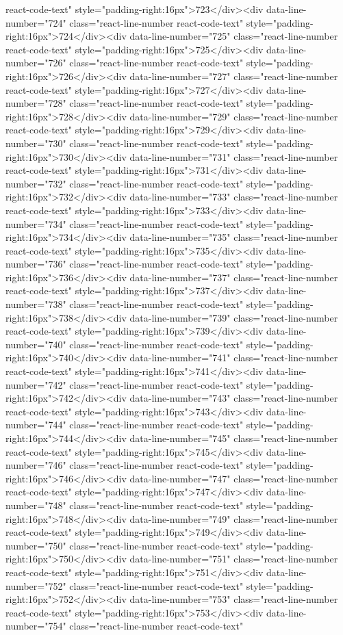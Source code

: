{{{{{{{react-code-text" style="padding-right:16px">723</div><div data-line-number="724" class="react-line-number react-code-text" style="padding-right:16px">724</div><div data-line-number="725" class="react-line-number react-code-text" style="padding-right:16px">725</div><div data-line-number="726" class="react-line-number react-code-text" style="padding-right:16px">726</div><div data-line-number="727" class="react-line-number react-code-text" style="padding-right:16px">727</div><div data-line-number="728" class="react-line-number react-code-text" style="padding-right:16px">728</div><div data-line-number="729" class="react-line-number react-code-text" style="padding-right:16px">729</div><div data-line-number="730" class="react-line-number react-code-text" style="padding-right:16px">730</div><div data-line-number="731" class="react-line-number react-code-text" style="padding-right:16px">731</div><div data-line-number="732" class="react-line-number react-code-text" style="padding-right:16px">732</div><div data-line-number="733" class="react-line-number react-code-text" style="padding-right:16px">733</div><div data-line-number="734" class="react-line-number react-code-text" style="padding-right:16px">734</div><div data-line-number="735" class="react-line-number react-code-text" style="padding-right:16px">735</div><div data-line-number="736" class="react-line-number react-code-text" style="padding-right:16px">736</div><div data-line-number="737" class="react-line-number react-code-text" style="padding-right:16px">737</div><div data-line-number="738" class="react-line-number react-code-text" style="padding-right:16px">738</div><div data-line-number="739" class="react-line-number react-code-text" style="padding-right:16px">739</div><div data-line-number="740" class="react-line-number react-code-text" style="padding-right:16px">740</div><div data-line-number="741" class="react-line-number react-code-text" style="padding-right:16px">741</div><div data-line-number="742" class="react-line-number react-code-text" style="padding-right:16px">742</div><div data-line-number="743" class="react-line-number react-code-text" style="padding-right:16px">743</div><div data-line-number="744" class="react-line-number react-code-text" style="padding-right:16px">744</div><div data-line-number="745" class="react-line-number react-code-text" style="padding-right:16px">745</div><div data-line-number="746" class="react-line-number react-code-text" style="padding-right:16px">746</div><div data-line-number="747" class="react-line-number react-code-text" style="padding-right:16px">747</div><div data-line-number="748" class="react-line-number react-code-text" style="padding-right:16px">748</div><div data-line-number="749" class="react-line-number react-code-text" style="padding-right:16px">749</div><div data-line-number="750" class="react-line-number react-code-text" style="padding-right:16px">750</div><div data-line-number="751" class="react-line-number react-code-text" style="padding-right:16px">751</div><div data-line-number="752" class="react-line-number react-code-text" style="padding-right:16px">752</div><div data-line-number="753" class="react-line-number react-code-text" style="padding-right:16px">753</div><div data-line-number="754" class="react-line-number react-code-text" }}}}}}}
